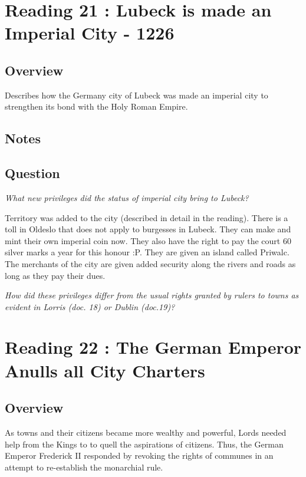 \documentclass[12pt]{article}
\begin{document}
\section*{Reading 21 : Lubeck is made an Imperial City - 1226}

\subsection*{Overview}

Describes how the Germany city of Lubeck was made an imperial city to strengthen its bond with the Holy Roman Empire. 

\subsection*{Notes}

\subsection*{Question}

\textit{What new privileges did the status of imperial city bring to Lubeck?}

Territory was added to the city (described in detail in the reading). There is a toll in Oldeslo that does not apply to burgesses in Lubeck. They can make and mint their own imperial coin now. They also have the right to pay the court 60 silver marks a year for this honour :P. They are given an island called Priwalc. The merchants of the city are given added security along the rivers and roads as long as they pay their dues.

\textit{How did these privileges differ from the usual rights granted by rulers to towns as evident in Lorris (doc. 18) or Dublin (doc.19)?}

\section*{Reading 22 : The German Emperor Anulls all City Charters}

\subsection*{Overview}

As towns and their citizens became more wealthy and powerful, Lords needed help from the Kings to to quell the aspirations of citizens. Thus, the German Emperor Frederick II responded by revoking the rights of communes in an attempt to re-establish the monarchial rule. 
\end{document}

